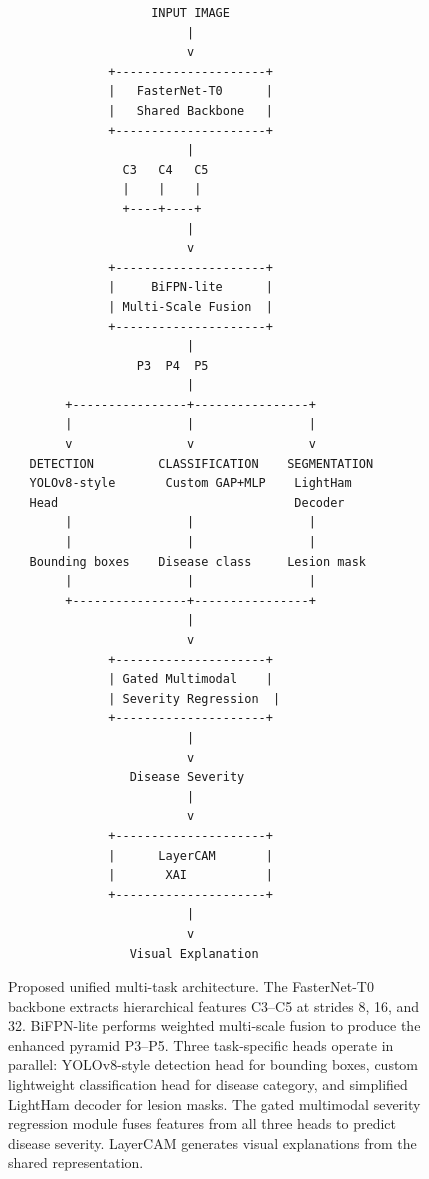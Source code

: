 \documentclass[10pt,a4paper,twocolumn]{article}
\begin{document}
\begin{figure}[htbp]
\centering
\small
\begin{verbatim}
                    INPUT IMAGE
                         |
                         v
              +---------------------+
              |   FasterNet-T0      |
              |   Shared Backbone   |
              +---------------------+
                         |
                C3   C4   C5
                |    |    |
                +----+----+
                         |
                         v
              +---------------------+
              |     BiFPN-lite      |
              | Multi-Scale Fusion  |
              +---------------------+
                         |
                  P3  P4  P5
                         |
        +----------------+----------------+
        |                |                |
        v                v                v
   DETECTION         CLASSIFICATION    SEGMENTATION
   YOLOv8-style       Custom GAP+MLP    LightHam
   Head                                 Decoder
        |                |                |
        |                |                |
   Bounding boxes    Disease class     Lesion mask
        |                |                |
        +----------------+----------------+
                         |
                         v
              +---------------------+
              | Gated Multimodal    |
              | Severity Regression  |
              +---------------------+
                         |
                         v
                 Disease Severity
                         |
                         v
              +---------------------+
              |      LayerCAM       |
              |       XAI           |
              +---------------------+
                         |
                         v
                 Visual Explanation
\end{verbatim}
\caption{Proposed unified multi-task architecture. The FasterNet-T0 backbone extracts hierarchical features C3--C5 at strides 8, 16, and 32. BiFPN-lite performs weighted multi-scale fusion to produce the enhanced pyramid P3--P5. Three task-specific heads operate in parallel: YOLOv8-style detection head for bounding boxes, custom lightweight classification head for disease category, and simplified LightHam decoder for lesion masks. The gated multimodal severity regression module fuses features from all three heads to predict disease severity. LayerCAM generates visual explanations from the shared representation.}
\label{fig:architecture}
\end{figure}
\end{document}
